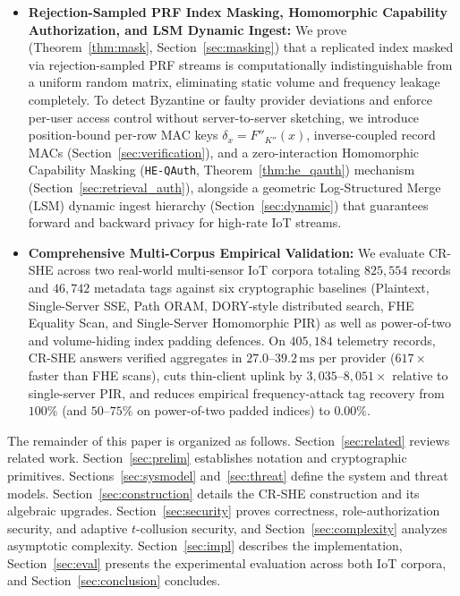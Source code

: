 \documentclass[11pt,a4paper]{article}
\begin{document}
\begin{itemize}
    \item \textbf{Rejection-Sampled PRF Index Masking, Homomorphic Capability Authorization, and LSM Dynamic Ingest:} We prove (Theorem~\ref{thm:mask}, Section~\ref{sec:masking}) that a replicated index masked via rejection-sampled PRF streams is computationally indistinguishable from a uniform random matrix, eliminating static volume and frequency leakage completely. To detect Byzantine or faulty provider deviations and enforce per-user access control without server-to-server sketching, we introduce position-bound per-row MAC keys $\delta_x = F''_{K''}(x)$, inverse-coupled record MACs (Section~\ref{sec:verification}), and a zero-interaction Homomorphic Capability Masking (\texttt{HE-QAuth}, Theorem~\ref{thm:he_qauth}) mechanism (Section~\ref{sec:retrieval_auth}), alongside a geometric Log-Structured Merge (LSM) dynamic ingest hierarchy (Section~\ref{sec:dynamic}) that guarantees forward and backward privacy for high-rate IoT streams.
    \item \textbf{Comprehensive Multi-Corpus Empirical Validation:} We evaluate CR-SHE across two real-world multi-sensor IoT corpora totaling $825{,}554$ records and $46{,}742$ metadata tags against six cryptographic baselines (Plaintext, Single-Server SSE, Path ORAM, DORY-style distributed search, FHE Equality Scan, and Single-Server Homomorphic PIR) as well as power-of-two and volume-hiding index padding defences. On $405{,}184$ telemetry records, CR-SHE answers verified aggregates in $27.0\text{--}39.2\,\text{ms}$ per provider ($617\times$ faster than FHE scans), cuts thin-client uplink by $3{,}035\text{--}8{,}051\times$ relative to single-server PIR, and reduces empirical frequency-attack tag recovery from $100\%$ (and $50\text{--}75\%$ on power-of-two padded indices) to $0.00\%$.
\end{itemize}

The remainder of this paper is organized as follows. Section~\ref{sec:related} reviews related work. Section~\ref{sec:prelim} establishes notation and cryptographic primitives. Sections~\ref{sec:sysmodel} and~\ref{sec:threat} define the system and threat models. Section~\ref{sec:construction} details the CR-SHE construction and its algebraic upgrades. Section~\ref{sec:security} proves correctness, role-authorization security, and adaptive $t$-collusion security, and Section~\ref{sec:complexity} analyzes asymptotic complexity. Section~\ref{sec:impl} describes the implementation, Section~\ref{sec:eval} presents the experimental evaluation across both IoT corpora, and Section~\ref{sec:conclusion} concludes.
\end{document}
